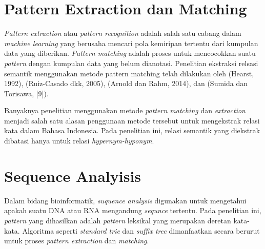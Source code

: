 \section{Pattern Extraction dan Matching}
\textit{Pattern extraction} atau \textit{pattern recognition} adalah salah satu cabang dalam \textit{machine learning} yang berusaha mencari pola kemiripan tertentu dari kumpulan data yang diberikan. \textit{Pattern matching} adalah proses untuk mencocokkan suatu \textit{pattern} dengan kumpulan data yang belum dianotasi. Penelitian ekstraksi relsasi semantik menggunakan metode pattern matching telah dilakukan oleh (Hearst, 1992), (Ruiz-Casado dkk, 2005), (Arnold dan Rahm, 2014), dan (Sumida dan Torisawa, [9]).

Banyaknya penelitian menggunakan metode \textit{pattern matching} dan \textit{extraction} menjadi salah satu alasan penggunaan metode tersebut untuk mengekstrak relasi kata dalam Bahasa Indonesia. Pada penelitian ini, relasi semantik yang diekstrak dibatasi hanya untuk relasi \textit{hypernym-hyponym}. 


\section{Sequence Analyisis}
Dalam bidang bioinformatik, \textit{suquence analysis} digunakan untuk mengetahui apakah suatu DNA atau RNA mengandung \textit{sequnce} tertentu. Pada penelitian ini, \textit{pattern} yang dihasilkan adalah \textit{pattern} leksikal yang merupakan deretan kata-kata. Algoritma seperti \textit{standard trie} dan \textit{suffix tree} dimanfaatkan secara berurut untuk proses \textit{pattern extraction} dan \textit{matching}.

